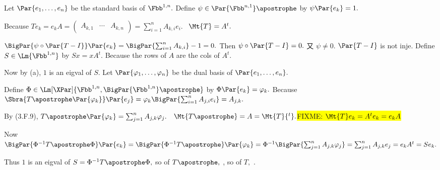 \Or Let $\Par{e_1,\dots,e_n}$ be the standard basis of $\Fbb^{1,n}.$ Define $\psi\in\Par{\Fbb^{n,1}}\apostrophe$ by $\psi\Par{e_k}=1.$\vspace{2pt}\par\quad\Hb
Because $Te_k=e_k A=\begin{pmatrix}A_{k,1}&\cdots&A_{k,n}\end{pmatrix}=\sum_{i=1}^n A_{k,i}e_i.$ \Corollary \,\,\,$\Mt{T}=A^t.$\vspace{3pt}\par\quad\Hb
$\BigPar{\psi\circ\Par{T-I}}\Par{e_k}=\BigPar{\sum_{i=1}^n A_{k,i}}-1=0.$ Then $\psi\circ\Par{T-I}=0.$ 又 $\psi\neq 0.$ $\Par{T-I}$ is not inje.\PfEnd\vspace{8pt}\quad\Hb
\Or Define $S\in\Lm{\Fbb^{1,n}}$ by $Sx=xA^t.$ Because the rows of $A$ are the cols of $A^t.$\par\quad\Hb
Now by (a), $1$ is an eigval of $S.$ Let $\Par{\varphi_1,\dots,\varphi_n}$ be the dual basis of $\Par{e_1,\dots,e_n}.$\vspace{2pt}\par\quad\Hb
Define $\Phi\in\Lm[\XPar]{\Fbb^{1,n},\BigPar{\Fbb^{1,n}}\apostrophe}$ by $\Phi\Par{e_k}=\varphi_k.$ Because $\Sbra{T\apostrophe\Par{\varphi_k}}\Par{e_j}=\varphi_k\BigPar{\sum_{i=1}^n A_{j,i}e_i}=A_{j,k}.$\par\quad\Hb
By (3.F.9), $T\apostrophe\Par{\varphi_k}=\sum_{j=1}^n A_{j,k}\varphi_j.$ \Corollary \,\,\,$\Mt{T\apostrophe}=A=\Mt{T}{^t}.$\colorbox{yellow}{FIXME: $\Mt{T}e_k=A^te_k=e_kA$}\vspace{3pt}\par\quad\Hb
Now $\BigPar{\Phi^{-1}T\apostrophe\Phi}\Par{e_k}=\BigPar{\Phi^{-1}T\apostrophe}\Par{\varphi_k}=\Phi^{-1}\BigPar{\sum_{j=1}^n A_{j,k}\varphi_j}=\sum_{j=1}^n A_{j,k}e_j=e_k A^t=Se_k.$\vspace{3pt}\par\quad\Hb
Thus $1$ is an eigval of $S=\Phi^{-1}T\apostrophe\Phi,$ so of $T\apostrophe,$ , so of $T,$ .\PfEnd
\SepLine

